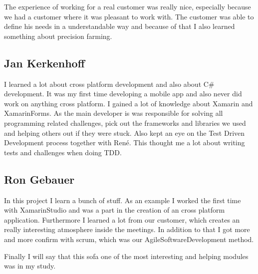 The experience of working for a real customer was really nice, especially because we had a customer where it was pleasant to work with. The customer was able to define his needs in a understandable way and because of that I also learned something about precision farming.
\subsection{Jan Kerkenhoff}
I learned a lot about cross platform development and also about C# development. It was my first time developing a mobile app and also never did work on anything cross platform. I gained a lot of knowledge about Xamarin and \gls{XamarinForms}.
As the main developer is was responsible for solving all programming related challenges, pick out the frameworks and libraries we used and helping others out if they were stuck. Also kept an eye on the Test Driven Development process together with René. This thought me a lot about writing tests and challenges when doing TDD.


\subsection{Ron Gebauer}

In this project I learn a bunch of stuff. As an example I worked the first time with \gls{XamarinStudio} and was a part in the creation of an cross platform application. Furthermore I learned a lot from our customer, which creates an really interesting atmosphere inside the meetings. In addition to that I got more and more confirm with \gls{scrum}, which was our \gls{AgileSoftwareDevelopment} method.		
		
Finally I will say that this \gls{sofa} one of the most interesting and helping modules was in my study.
